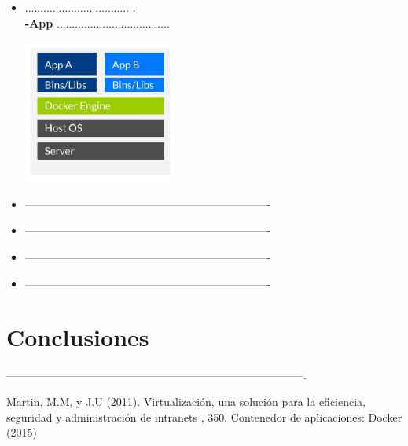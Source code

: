 \documentclass[twoside,twocolumn]{article}
\begin{document}
\begin{itemize}
	\item ..................................
.
	\\ \textbf{-App} .....................................
	\begin{center}
	\includegraphics[width=5cm]{./Imagenes/jerarquia2} 
	\end{center}
\end{itemize} 

\begin{itemize}
	\item -------------------------------------------------------------------
		\item -------------------------------------------------------------------
			\item -------------------------------------------------------------------
	\item -------------------------------------------------------------------



\end{itemize} 

\section{Conclusiones}

---------------------------------------------------------------------------------.

\begin{thebibliography}{99} %

Martin, M.M,  y J.U (2011).
\newblock Virtualización, una solución para la eficiencia,
seguridad y administración de intranets
, 350.
\newblock Contenedor de aplicaciones: Docker (2015)
 
 
\end{thebibliography}

\end{document}
